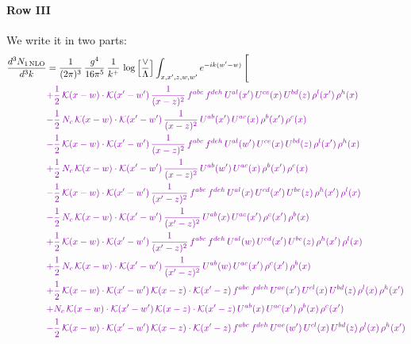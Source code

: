 \documentclass[10pt]{article}
\numberwithin{equation}{section}
\begin{document}
\paragraph{Row III}
We write it in two parts: 
\begin{align}
\frac{d^{3}N_{1\,\mathrm{NLO}}}{d^{3}k} & = \frac{1}{(2\pi)^{3}}\,\frac{g^{4}}{16\pi^{5}}\,\frac{1}{k^{+}}\,\log\Big[\frac{\vee}{\Lambda}\Big]\int_{x,x',z,w,w'}e^{-ik(w'-w)}\,\Bigg[\notag\\ &{\color{CC}  +\frac{1}{2}\,\mathcal{K}(x-w)\cdot\mathcal{K}(x'-w')\,\frac{1}{(x-z)^{2}}\,f^{abc}\,f^{deh}\,U^{al}(x')\,U^{ce}(x)\,U^{bd}(z)\,\rho^{l}(x')\,\rho^{h}(x)} \notag\\
&{\color{CC} -\frac{1}{2}\,N_{c}\,\mathcal{K}(x-w)\cdot\mathcal{K}(x'-w')\,\frac{1}{(x-z)^{2}}\,U^{ab}(x')\,U^{ac}(x)\,\rho^{b}(x')\,\rho^{c}(x)} \notag\\
&{\color{CC} -\frac{1}{2}\,\mathcal{K}(x-w)\cdot\mathcal{K}(x'-w')\,\frac{1}{(x-z)^{2}}\,f^{abc}\,f^{deh}\,U^{al}(w')\,U^{ce}(x)\,U^{bd}(z)\,\rho^{l}(x')\,\rho^{h}(x)} \notag\\
&{\color{CC} +\frac{1}{2}\,N_{c}\,\mathcal{K}(x-w)\cdot\mathcal{K}(x'-w')\,\frac{1}{(x-z)^{2}}\,U^{ab}(w')\,U^{ac}(x)\,\rho^{b}(x')\,\rho^{c}(x)} \notag\\
&{\color{CC} -\frac{1}{2}\,\mathcal{K}(x-w)\cdot\mathcal{K}(x'-w')\,\frac{1}{(x'-z)^{2}}\,f^{abc}\,f^{deh}\,U^{al}(x)\,U^{cd}(x')\,U^{be}(z)\,\rho^{h}(x')\,\rho^{l}(x)} \notag\\
&{\color{CC} -\frac{1}{2}\,N_{c}\,\mathcal{K}(x-w)\cdot\mathcal{K}(x'-w')\,\frac{1}{(x'-z)^{2}}\,U^{ab}(x)\,U^{ac}(x')\,\rho^{c}(x')\,\rho^{b}(x)} \notag\\
&{\color{CC} +\frac{1}{2}\,\mathcal{K}(x-w)\cdot\mathcal{K}(x'-w')\,\frac{1}{(x'-z)^{2}}\,f^{abc}\,f^{deh}\,U^{al}(w)\,U^{cd}(x')\,U^{be}(z)\,\rho^{h}(x')\,\rho^{l}(x)} \notag\\
&{\color{CC} +\frac{1}{2}\,N_{c}\,\mathcal{K}(x-w)\cdot\mathcal{K}(x'-w')\,\frac{1}{(x'-z)^{2}}\,U^{ab}(w)\,U^{ac}(x')\,\rho^{c}(x')\,\rho^{b}(x)} \notag\\
&{\color{CC} +\frac{1}{2}\,\mathcal{K}(x-w)\cdot\mathcal{K}(x'-w')\,\mathcal{K}(x-z)\cdot\mathcal{K}(x'-z)\,f^{abc}\,f^{deh}\,U^{ae}(x')\,U^{cl}(x)\,U^{bd}(z)\,\rho^{l}(x)\,\rho^{h}(x')} \notag\\
&{\color{CC} +N_{c}\,\mathcal{K}(x-w)\cdot\mathcal{K}(x'-w')\,\mathcal{K}(x-z)\cdot\mathcal{K}(x'-z)\,U^{ab}(x)\,U^{ac}(x')\,\rho^{b}(x)\,\rho^{c}(x')} \notag\\
&{\color{CC} -\frac{1}{2}\,\mathcal{K}(x-w)\cdot\mathcal{K}(x'-w')\,\mathcal{K}(x-z)\cdot\mathcal{K}(x'-z)\,f^{abc}\,f^{deh}\,U^{ae}(w')\,U^{cl}(x)\,U^{bd}(z)\,\rho^{l}(x)\,\rho^{h}(x')} \notag\\

\end{align}
\end{document}
